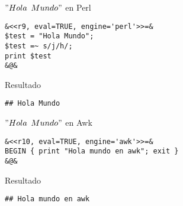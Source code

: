 \documentclass[11pt]{beamer}					%
\begin{document}
			\begin{frame}[fragile]
											
					\begin{block}{$"Hola$ $Mundo"$ en Perl}
					\begin{tiny}\begin{lstlisting}[frame=single,style=base]				
&<<r9, eval=TRUE, engine='perl'>>=&
$test = "Hola Mundo";
$test =~ s/j/h/;
print $test
&@&
				\end{lstlisting}	\end{tiny}
				\end{block}	
				\begin{block}{Resultado}
					\begin{tiny}\begin{lstlisting}[frame=single,style=base]				
## Hola Mundo
				\end{lstlisting}	\end{tiny}
				\end{block}
						
			\end{frame}
			\begin{frame}[fragile]
							
					\begin{block}{$"Hola$ $Mundo"$ en Awk}
					\begin{tiny}\begin{lstlisting}[frame=single,style=base]				
&<<r10, eval=TRUE, engine='awk'>>=&
BEGIN { print "Hola mundo en awk"; exit }
&@&
				\end{lstlisting}	\end{tiny}
				\end{block}	
				\begin{block}{Resultado}
					\begin{tiny}\begin{lstlisting}[frame=single,style=base]				
## Hola mundo en awk
				\end{lstlisting}	\end{tiny}
				\end{block}
						
			\end{frame}
\end{document}
